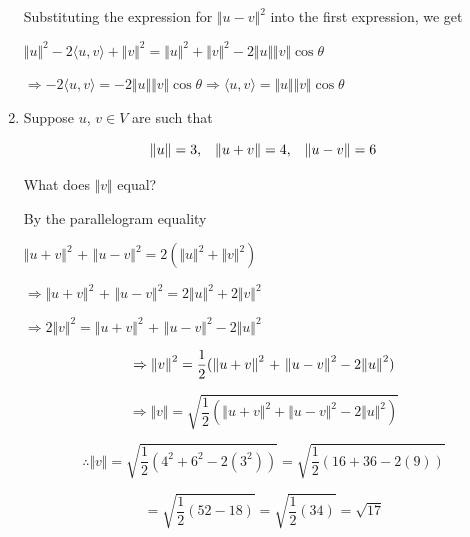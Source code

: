 \documentclass[fleqn]{article}
\makeatletter
\newenvironment{equationCenter}{\@fleqnfalse\begin{equation*}}{\end{equation*}}
\makeatother
\begin{document}
\begin{enumerate}[nolistsep]
			Substituting the expression for ${\Vert u - v \Vert}^2$ into the first expression, we get
			
			${\Vert u \Vert}^2 - 2\langle u, v \rangle + {\Vert v \Vert}^2 = {\Vert u \Vert}^2 + {\Vert v \Vert}^2  - 2{\Vert u \Vert}{\Vert v \Vert}\cos\theta$
			
			$\Rightarrow - 2\langle u, v \rangle = - 2{\Vert u \Vert}{\Vert v \Vert}\cos\theta \Rightarrow \langle u, v \rangle = {\Vert u \Vert}{\Vert v \Vert}\cos\theta$
		
		\pagebreak
		\item Suppose $u$, $v \in V$ are such that
		
			\begin{equationCenter}
				\Vert u \Vert = 3 \text{,\quad} \Vert u + v \Vert = 4 \text{,\quad} \Vert u - v \Vert = 6
			\end{equationCenter}
			
			What does $\Vert v \Vert$ equal?
			
			By the parallelogram equality
			
				${\Vert u + v \Vert}^2$ + ${\Vert u - v \Vert}^2 = 2({\Vert u \Vert}^2 + {\Vert v \Vert}^2)$
				
				$\Rightarrow {\Vert u + v \Vert}^2$ + ${\Vert u - v \Vert}^2 = 2{\Vert u \Vert}^2 + 2{\Vert v \Vert}^2$
				
				$\Rightarrow 2{\Vert v \Vert}^2 = {\Vert u + v \Vert}^2$ + ${\Vert u - v \Vert}^2 - 2{\Vert u \Vert}^2$
				
				\begin{equation*}
					\Rightarrow {\Vert v \Vert}^2 = \frac{1}{2}({\Vert u + v \Vert}^2$ + ${\Vert u - v \Vert}^2 - 2{\Vert u \Vert}^2)
				\end{equation*}
				
				\begin{equation*}
					\Rightarrow {\Vert v \Vert} = \sqrt{\frac{1}{2}({\Vert u + v \Vert}^2 + {\Vert u - v \Vert}^2 - 2{\Vert u \Vert}^2)}
				\end{equation*}
				
				\begin{equation*}
					\therefore {\Vert v \Vert} = \sqrt{\frac{1}{2}(4^2 + 6^2 - 2(3^2))} = \sqrt{\frac{1}{2} (16 + 36 - 2(9))}
				\end{equation*}
				
				\begin{equation*}
					 = \sqrt{\frac{1}{2}(52 - 18)} = \sqrt{\frac{1}{2}(34)} = \sqrt{17}
				\end{equation*}
	\end{enumerate}
\end{document}
